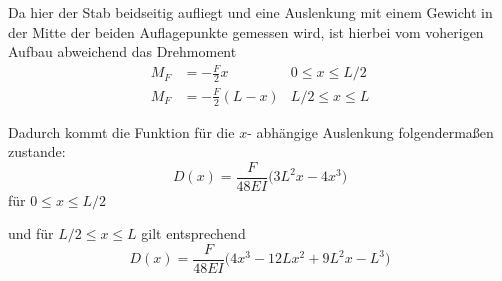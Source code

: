 Da hier der Stab beidseitig aufliegt und eine Auslenkung mit einem Gewicht in der Mitte der beiden Auflagepunkte gemessen wird, ist hierbei
vom voherigen Aufbau abweichend das Drehmoment \begin{align}
M_F &= - \frac{F}2 x       &   0 \leq x \leq L/2 \\
M_F &= - \frac{F}2 (L - x) & L/2 \leq x \leq L
\end{align}

Dadurch kommt die Funktion für die $x$- abhängige Auslenkung folgendermaßen zustande: \begin{equation}
   D(x) = \frac{F}{48EI} \bigl( 3L^2 x -4x^3 \bigr)
   \label{eqn:D2_gleich}
\end{equation} für $0 \leq x \leq L/2$

und für $L/2 \leq x \leq L$ gilt entsprechend \begin{equation}
    D(x) = \frac{F}{48EI} \bigl( 4x^3 - 12Lx^2 + 9L^2 x - L^3 \bigr)
    \label{eqn:D3_gleich}
\end{equation}

